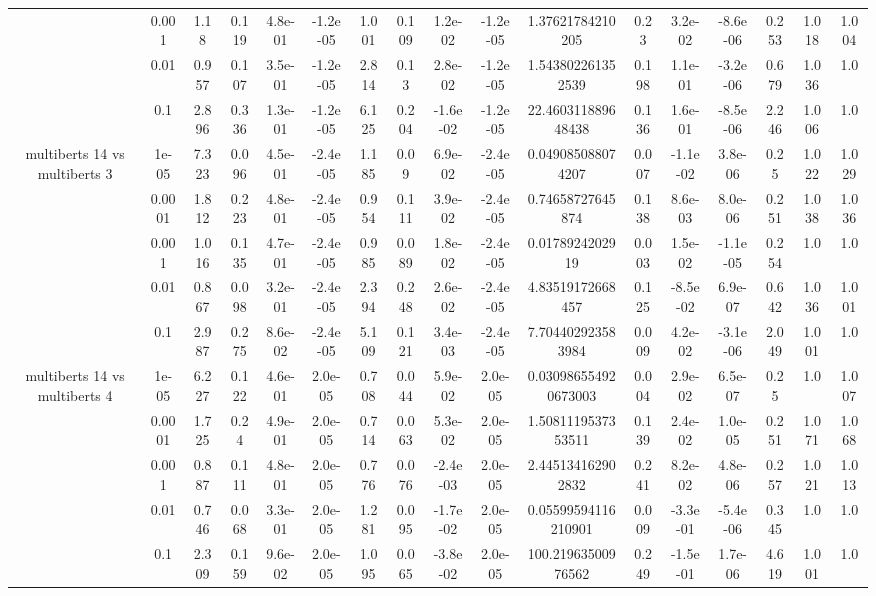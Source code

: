 \begin{tabular}{|c|c|c|c|c|c|c|c|c|c|c|c|c|c|c|c|c|}
 & 0.001 & 1.18 & 0.119 & 4.8e-01 & -1.2e-05 & 1.001 & 0.109 & 1.2e-02 & -1.2e-05 & 1.37621784210205 & 0.23 & 3.2e-02 & -8.6e-06 & 0.253 & 1.018 & 1.004 \\
 & 0.01 & 0.957 & 0.107 & 3.5e-01 & -1.2e-05 & 2.814 & 0.13 & 2.8e-02 & -1.2e-05 & 1.543802261352539 & 0.198 & 1.1e-01 & -3.2e-06 & 0.679 & 1.036 & 1.0 \\
 & 0.1 & 2.896 & 0.336 & 1.3e-01 & -1.2e-05 & 6.125 & 0.204 & -1.6e-02 & -1.2e-05 & 22.460311889648438 & 0.136 & 1.6e-01 & -8.5e-06 & 2.246 & 1.006 & 1.0 \\
\hline
\multirow{5}{*}{multiberts 14 vs multiberts 3} & 1e-05 & 7.323 & 0.096 & 4.5e-01 & -2.4e-05 & 1.185 & 0.09 & 6.9e-02 & -2.4e-05 & 0.049085088074207 & 0.007 & -1.1e-02 & 3.8e-06 & 0.25 & 1.022 & 1.029 \\
 & 0.0001 & 1.812 & 0.223 & 4.8e-01 & -2.4e-05 & 0.954 & 0.111 & 3.9e-02 & -2.4e-05 & 0.74658727645874 & 0.138 & 8.6e-03 & 8.0e-06 & 0.251 & 1.038 & 1.036 \\
 & 0.001 & 1.016 & 0.135 & 4.7e-01 & -2.4e-05 & 0.985 & 0.089 & 1.8e-02 & -2.4e-05 & 0.0178924202919 & 0.003 & 1.5e-02 & -1.1e-05 & 0.254 & 1.0 & 1.0 \\
 & 0.01 & 0.867 & 0.098 & 3.2e-01 & -2.4e-05 & 2.394 & 0.248 & 2.6e-02 & -2.4e-05 & 4.83519172668457 & 0.125 & -8.5e-02 & 6.9e-07 & 0.642 & 1.036 & 1.001 \\
 & 0.1 & 2.987 & 0.275 & 8.6e-02 & -2.4e-05 & 5.109 & 0.121 & 3.4e-03 & -2.4e-05 & 7.704402923583984 & 0.009 & 4.2e-02 & -3.1e-06 & 2.049 & 1.001 & 1.0 \\
\hline
\multirow{5}{*}{multiberts 14 vs multiberts 4} & 1e-05 & 6.227 & 0.122 & 4.6e-01 & 2.0e-05 & 0.708 & 0.044 & 5.9e-02 & 2.0e-05 & 0.030986554920673003 & 0.004 & 2.9e-02 & 6.5e-07 & 0.25 & 1.0 & 1.007 \\
 & 0.0001 & 1.725 & 0.24 & 4.9e-01 & 2.0e-05 & 0.714 & 0.063 & 5.3e-02 & 2.0e-05 & 1.5081119537353511 & 0.139 & 2.4e-02 & 1.0e-05 & 0.251 & 1.071 & 1.068 \\
 & 0.001 & 0.887 & 0.111 & 4.8e-01 & 2.0e-05 & 0.776 & 0.076 & -2.4e-03 & 2.0e-05 & 2.445134162902832 & 0.241 & 8.2e-02 & 4.8e-06 & 0.257 & 1.021 & 1.013 \\
 & 0.01 & 0.746 & 0.068 & 3.3e-01 & 2.0e-05 & 1.281 & 0.095 & -1.7e-02 & 2.0e-05 & 0.05599594116210901 & 0.009 & -3.3e-01 & -5.4e-06 & 0.345 & 1.0 & 1.0 \\
 & 0.1 & 2.309 & 0.159 & 9.6e-02 & 2.0e-05 & 1.095 & 0.065 & -3.8e-02 & 2.0e-05 & 100.21963500976562 & 0.249 & -1.5e-01 & 1.7e-06 & 4.619 & 1.001 & 1.0 \\

\end{tabular}
